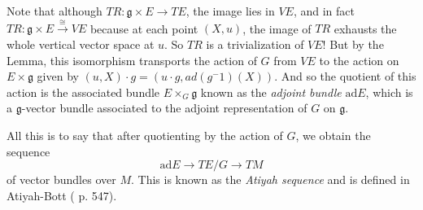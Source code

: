 \documentclass[12pt]{article}
\newcommand{\ad}{\mathrm{ad}}
\begin{document}
Note that although $TR:\mathfrak{g}\times E\to TE$, the image lies in $VE$, and in fact $TR:\mathfrak{g}\times E \xrightarrow{\cong} VE$ because at each point $(X, u)$, the image of $TR$ exhausts the whole vertical vector space at $u$. So $TR$ is a trivialization of $VE$! But by the Lemma, this isomorphism transports the action of $G$ from $VE$ to the action on $E\times \mathfrak{g}$ given by $(u, X)\cdot g = (u\cdot g, ad(g^-1)(X))$. And so the quotient of this action is the associated bundle $E\times_G \mathfrak{g}$ known as the \emph{adjoint bundle} $\ad E$, which is a $\mathfrak{g}$-vector bundle associated to the adjoint representation of $G$ on $\mathfrak{g}$.

All this is to say that after quotienting by the action of $G$, we obtain the sequence $$\ad E\to TE/G \to TM$$ of vector bundles over $M$. This is known as the \emph{Atiyah sequence} and is defined in Atiyah-Bott (\cite{atiyah1983yang} p. 547).


\end{document}
